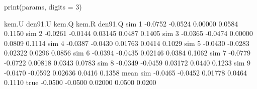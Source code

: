 \begin{Schunk}
\begin{Sinput}
 print(params, digits = 3)
\end{Sinput}
\begin{Soutput}
           kem.U den91.U   kem.Q  kem.R den91.Q
sim 1    -0.0752 -0.0524 0.00000 0.0584  0.1150
sim 2    -0.0261 -0.0144 0.03145 0.0487  0.1405
sim 3    -0.0365 -0.0474 0.00000 0.0809  0.1114
sim 4    -0.0387 -0.0430 0.01763 0.0414  0.1029
sim 5    -0.0430 -0.0283 0.02322 0.0296  0.0856
sim 6    -0.0394 -0.0435 0.02146 0.0384  0.1062
sim 7    -0.0779 -0.0722 0.00818 0.0343  0.0783
sim 8    -0.0349 -0.0459 0.03172 0.0440  0.1233
sim 9    -0.0470 -0.0592 0.02636 0.0416  0.1358
mean sim -0.0465 -0.0452 0.01778 0.0464  0.1110
true     -0.0500 -0.0500 0.02000 0.0500  0.0200
\end{Soutput}
\end{Schunk}
